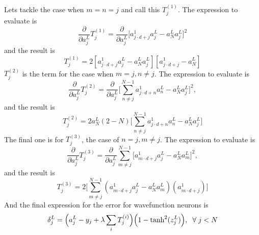 Lets tackle the case when $m = n = j$ and call this $T^{(1)}_j$. The expression to evaluate is
\begin{equation}
	\frac{\partial}{\partial a^L_j}
	T^{(1)}_j = 
	\frac{\partial}{\partial a^L_j} 
	\big[a^1_{j \cdot d + j} a^L_j - a^L_N a^L_j \big]^2 
\end{equation}
and the result is 
\begin{equation}
	T^{(1)}_j = 
	2 [a^1_{j \cdot d + j} a^L_j - a^L_N a^L_j][a^1_{j \cdot d + j} - a^L_N]
\end{equation}
$T^{(2)}_j$ is the term for the case when $m = j, n \ne j$. The expression to evaluate is 
\begin{equation}
	\frac{\partial}{\partial a^L_j}
	T^{(2)}_j =
	\frac{\partial}{\partial a^L_j} 
	\Big[\sum^{N-1}_{n \ne j} a^1_{j \cdot d + n} a^L_n - a^L_N a^L_j \Big]^2,
\end{equation}
and the result is 
\begin{equation}
	T^{(2)}_j =
	2 a^L_N (2 - N) 
	\Big[ \sum^{N-1}_{n \ne j} a^1_{j \cdot d + n} a^L_n - a^L_N a^L_j \Big]
\end{equation}
The final one is for $T^{(3)}_j$, the case of $n = j, m \ne j$. The expression to evaluate is 
\begin{equation}
	\frac{\partial}{\partial a^L_j}
	T^{(3)}_j =
	\frac{\partial}{\partial a^L_j}
	\sum^{N-1}_{m \ne j} \big[a^1_{m \cdot d + j} a^L_j - a^L_N a^L_m \big]^2,
\end{equation}
and the result is 
\begin{equation}
	T^{(3)}_j = 2 
	\Big[ 
		\sum^{N-1}_{m \ne j} 
		(a^1_{m \cdot d + j} a^L_j - a^L_N a^L_m)
		(a^1_{m \cdot d + j})
	\Big]
\end{equation}
And the final expression for the error for wavefunction neurons is
\begin{equation}
	\delta^L_j =
	\Big(
		a^L_j - y_j +
		\lambda \sum_i T^{(i)}_j 
	\Big)
	\Big( 1 - \mathrm{tanh}^2(z^L_j) \Big), \hspace{2mm} \forall \hspace{1mm} j < N
\end{equation}


